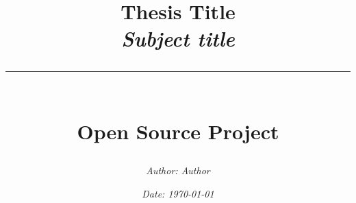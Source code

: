 \newcommand{\authorName}{Author}
\newcommand{\titleName}{Thesis Title}
\newcommand{\subject}{Subject title}
\newcommand{\projectType}{Open Source Project}

\title{
\vspace*{1in}

{\huge \textbf{\titleName}}\\[0.5in]

{\Large \textit{\subject}}\\[0.2in]

\rule{0.6\textwidth}{1pt}\\[0.2in]

\textbf{\projectType}\\

\vfill
}

\author{\textit{Author: \authorName}}
\date{\textit{Date: \today}}
